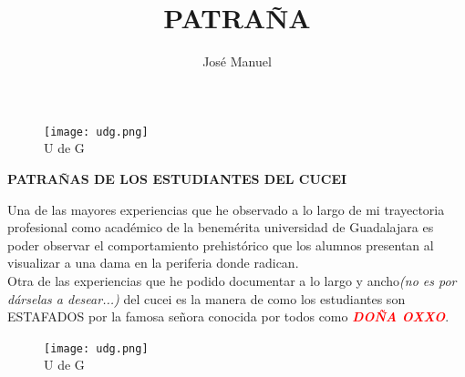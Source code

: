 \documentclass[12pt,a4paper]{book}
\author{José Manuel}
\title{PATRAÑA}
\begin{document}
\begin{figure}[hbtp]
\centering
\texttt{[image: udg.png]}\\
U de G
\end{figure}

\newpage
\begin{center}
\textbf{PATRAÑAS DE LOS ESTUDIANTES DEL CUCEI}
\end{center}

Una de las mayores experiencias que he observado a lo largo de mi trayectoria profesional como académico de la benem\'{e}rita universidad de Guadalajara es poder observar el comportamiento prehist\'{o}rico que los alumnos presentan al visualizar a una dama en la periferia donde radican.\\

Otra de las experiencias que he podido documentar a lo largo y ancho\textit{(no es por dárselas a desear...)} del cucei es la manera de como los estudiantes son \hspace{5pt}
ESTAFADOS \hspace{5pt} por la famosa señora conocida por todos como \textcolor{red}{\textbf{\textit{DOÑA OXXO}}}.\\ \bigskip

\begin{figure}[hbtp]
\centering
\texttt{[image: udg.png]}\\
U de G
\end{figure}
\end{document}
